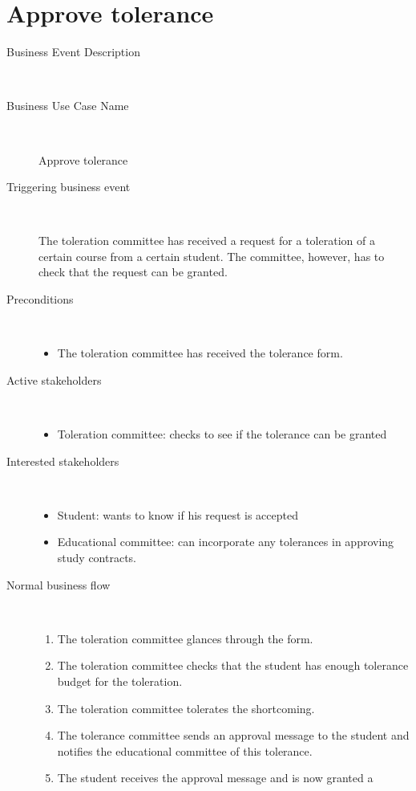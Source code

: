 \section{Approve tolerance}

\begin{description}
	\item[Business Event Description] \ 
		\par 
	\item[Business Use Case Name] \ 
		\par Approve tolerance
	\item[Triggering business event] \ 
		\par The toleration committee has received a request for a toleration of a
		certain course from a certain student. The committee, however, has to check that the
		request can be granted. 
	\item[Preconditions] \
	\begin{itemize}
		\item The toleration committee has received the tolerance form.
	\end{itemize}
	\item[Active stakeholders] \ 
	\begin{itemize}
		\item Toleration committee: checks to see if the tolerance can be granted
	\end{itemize}
	\item[Interested stakeholders] \ 
		\begin{itemize}
		\item Student: wants to know if his request is accepted
		\item Educational committee: can incorporate any tolerances in approving study
		contracts.
		\end{itemize}
	\item[Normal business flow] \ 
	\begin{enumerate}
	  	\item The toleration committee glances through the form. 
	  	\item The toleration committee checks that the student has enough tolerance
	  	budget for the toleration.
	  	\item The toleration committee tolerates the shortcoming.
	  	\item The tolerance committee sends an approval message to the student and
	  	notifies the educational committee of this tolerance.
	  	\item The student receives the approval message and is now granted a

\end{enumerate}
\end{description}
